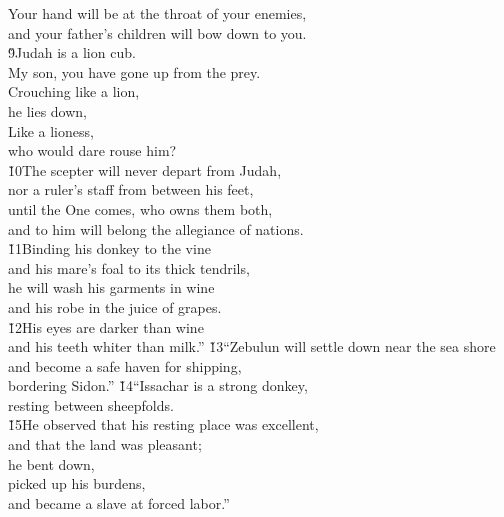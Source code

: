 \begin{poetry}
\poemll    Your hand will be at the throat of your enemies, \\
\poeml and your father's children will bow down to you. \\
\poeml \v{9}Judah is a lion cub. \\
\poemll    My son, you have gone up from the prey. \\
\poeml Crouching like a lion, \\
\poemll    he lies down, \\
\poeml Like a lioness, \\
\poemll    who would dare rouse him? \\
\poeml \v{10}The scepter will never depart from Judah, \\
\poemll    nor a ruler's staff from between his feet, \\
\poeml until the One comes, who owns them both, \\
\poemll    and to him will belong the allegiance of nations. \\
\poeml \v{11}Binding his donkey to the vine \\
\poemll    and his mare's foal to its thick tendrils, \\
\poeml he will wash his garments in wine \\
\poemll    and his robe in the juice of grapes. \\
\poeml \v{12}His eyes are darker than wine \\
\poemll    and his teeth whiter than milk.''
\poeml \v{13}``Zebulun will settle down near the sea shore \\
\poemll    and become a safe haven for shipping, \\
\poemlll       bordering Sidon.''
\poeml \v{14}``Issachar is a strong donkey, \\
\poemll    resting between sheepfolds. \\
\poeml \v{15}He observed that his resting place was excellent, \\
\poemll    and that the land was pleasant; \\
\poeml he bent down, \\
\poemll    picked up his burdens, \\
\poemlll       and became a slave at forced labor.''

\end{poetry}
